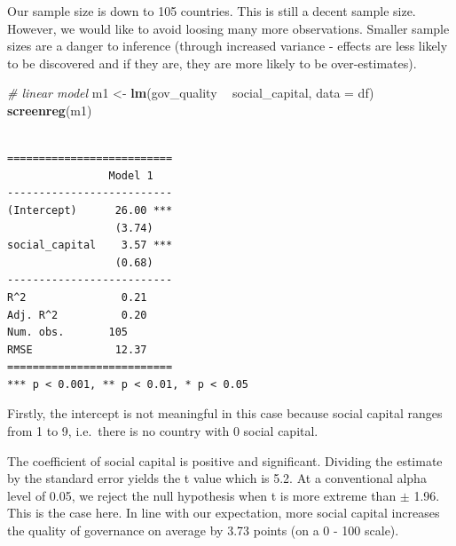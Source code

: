 \documentclass[]{article}
\newenvironment{Shaded}{\begin{snugshade}}{\end{snugshade}}
\newcommand{\KeywordTok}[1]{\textcolor[rgb]{0.13,0.29,0.53}{\textbf{#1}}}
\newcommand{\DataTypeTok}[1]{\textcolor[rgb]{0.13,0.29,0.53}{#1}}
\newcommand{\StringTok}[1]{\textcolor[rgb]{0.31,0.60,0.02}{#1}}
\newcommand{\CommentTok}[1]{\textcolor[rgb]{0.56,0.35,0.01}{\textit{#1}}}
\newcommand{\OperatorTok}[1]{\textcolor[rgb]{0.81,0.36,0.00}{\textbf{#1}}}
\newcommand{\NormalTok}[1]{#1}
\theoremstyle{definition}
\theoremstyle{definition}
\theoremstyle{definition}
\theoremstyle{remark}
\begin{document}
\begin{Shaded}
\end{Shaded}

Our sample size is down to 105 countries. This is still a decent sample
size. However, we would like to avoid loosing many more observations.
Smaller sample sizes are a danger to inference (through increased
variance - effects are less likely to be discovered and if they are,
they are more likely to be over-estimates).

\begin{Shaded}
\begin{Highlighting}[]
\CommentTok{# linear model}
\NormalTok{m1 <-}\StringTok{ }\KeywordTok{lm}\NormalTok{(gov_quality }\OperatorTok{~}\StringTok{ }\NormalTok{social_capital, }\DataTypeTok{data =}\NormalTok{ df)}
\KeywordTok{screenreg}\NormalTok{(m1)}
\end{Highlighting}
\end{Shaded}

\begin{verbatim}

==========================
                Model 1   
--------------------------
(Intercept)      26.00 ***
                 (3.74)   
social_capital    3.57 ***
                 (0.68)   
--------------------------
R^2               0.21    
Adj. R^2          0.20    
Num. obs.       105       
RMSE             12.37    
==========================
*** p < 0.001, ** p < 0.01, * p < 0.05
\end{verbatim}

Firstly, the intercept is not meaningful in this case because social
capital ranges from 1 to 9, i.e.~there is no country with 0 social
capital.

The coefficient of social capital is positive and significant. Dividing
the estimate by the standard error yields the t value which is 5.2. At a
conventional alpha level of 0.05, we reject the null hypothesis when t
is more extreme than \(\pm\) 1.96. This is the case here. In line with
our expectation, more social capital increases the quality of governance
on average by 3.73 points (on a 0 - 100 scale).
\end{document}
